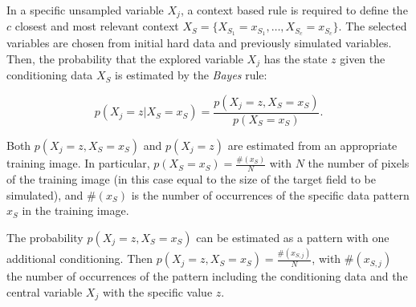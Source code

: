 In a specific unsampled variable $X_{j}$, a context based rule is required to define the $c$ closest and most relevant context $X_S = \{ X_{S_1} = x_{S_1}, \ldots, X_{S_c} = x_{S_c} \}$. The selected variables are chosen from initial hard data and previously simulated variables. Then, the probability that the explored variable $X_{j}$ has the state $z$ given the conditioning data $X_{S}$ is estimated by the \emph{Bayes} rule:

\begin{equation}
p(X_{j} = z | X_{S} = x_{S}) = \frac{p(X_{j} = z, X_{S} = x_{S}) }{p(X_{S} = x_{S}) } .
\label{eq:bayesMPS}
\end{equation}


Both $p(X_{j} = z, X_{S} = x_{S}) $ and $p( X_{j} = z)$ are estimated from an appropriate training image. In particular, $p( X_{S} = x_{S}) = \frac{\#(x_{S})}{N}$ with $N$ the number of pixels of the training image (in this case equal to the size of the target field to be simulated), and $\#(x_{S})$ is the number of occurrences of the specific data pattern $x_{S}$ in the training image. 

The probability $p(X_{j} = z, X_{S} = x_{S}) $ can be estimated as a pattern with one additional conditioning. Then $p(X_{j} = z, X_{S} = x_{S})  =  \frac{\#(x_{S,j})}{N}$, with $\#(x_{S,j})$ the number of occurrences of the pattern including the conditioning data and the central variable $X_{j}$ with the specific value $z$. 








































